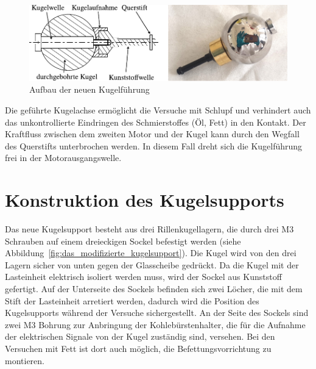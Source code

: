 \begin{figure}[htb]
    \centering
    \includegraphics[]{./images/kugelfuehrung.pdf}
    \caption{Aufbau der neuen Kugelführung}
    \label{fig:aufbau_der_neuen_kugelfuehrung}
\end{figure}

Die geführte Kugelachse ermöglicht die Versuche mit Schlupf und verhindert auch das unkontrollierte Eindringen des Schmierstoffes (Öl, Fett) in den Kontakt.
Der Kraftfluss zwischen dem zweiten Motor und der Kugel kann durch den Wegfall des Querstifts unterbrochen werden.
In diesem Fall dreht sich die Kugelführung frei in der Motorausgangswelle.

\section{Konstruktion des Kugelsupports}
\label{sec:konstruktion_des_kugelsupports}

Das neue Kugelsupport besteht aus drei Rillenkugellagern, die durch drei M3 Schrauben auf einem dreieckigen Sockel befestigt werden (siehe Abbildung~\ref{fig:das_modifizierte_kugelsupport}).
Die Kugel wird von den drei Lagern sicher von unten gegen der Glasscheibe gedrückt.
Da die Kugel mit der Lasteinheit elektrisch isoliert werden muss, wird der Sockel aus Kunststoff gefertigt.
Auf der Unterseite des Sockels befinden sich zwei Löcher, die mit dem Stift der Lasteinheit arretiert werden, dadurch wird die Position des Kugelsupports während der Versuche sichergestellt.
An der Seite des Sockels sind zwei M3 Bohrung zur Anbringung der Kohlebürstenhalter, die für die Aufnahme der elektrischen Signale von der Kugel zuständig sind, versehen.
Bei den Versuchen mit Fett ist dort auch möglich, die Befettungsvorrichtung zu montieren.

